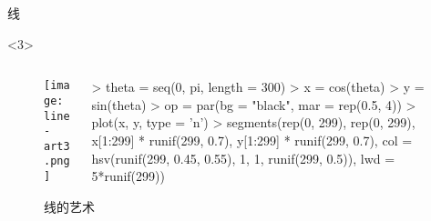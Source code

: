 \begin{frame}[c,fragile]{\subsecname}{线}
\begin{onlyenv}<3>
\begin{figure}
  \begin{columns}
    \begin{column}[c]{.4\textwidth}
        \texttt{[image: line-art3.png]}
    \end{column}

    \begin{column}[c]{.6\textwidth}
\begin{rcode}
> theta = seq(0, pi, length = 300)
> x = cos(theta)
> y = sin(theta)
> op = par(bg = "black", mar = rep(0.5, 4))
> plot(x, y, type = 'n')
> segments(rep(0, 299), rep(0, 299), x[1:299] * runif(299, 0.7), y[1:299] * runif(299, 0.7), col = hsv(runif(299, 0.45, 0.55), 1, 1, runif(299, 0.5)), lwd = 5*runif(299))
\end{rcode}
    \end{column}
  \end{columns}
  \caption{线的艺术}
\end{figure}
\end{onlyenv}
\end{frame}

